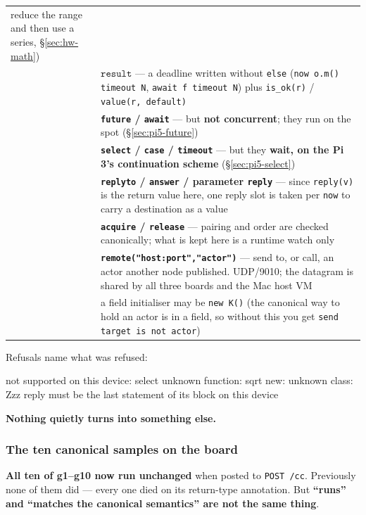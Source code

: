 \documentclass[11pt,a4paper]{article}
\newcommand{\ty}[1]{\ensuremath{\mathtt{#1}}}
\begin{document}
\begin{center}
\begin{tabular}{@{}p{20mm}p{102mm}@{}}
       reduce the range and then use a series, \S\ref{sec:hw-math}) \\
     & \textbf{\ty{result}} --- a deadline written without \texttt{else}
       (\texttt{now o.m() timeout N}, \texttt{await f timeout N}) plus
       \texttt{is\_ok(r)} / \texttt{value(r, default)} \\
     & \textbf{\texttt{future} / \texttt{await}} --- but \textbf{not
       concurrent}; they run on the spot (\S\ref{sec:pi5-future}) \\
     & \textbf{\texttt{select} / \texttt{case} / \texttt{timeout}} --- but they
       \textbf{wait, on the Pi 3's continuation scheme} (\S\ref{sec:pi5-select}) \\
     & \textbf{\texttt{replyto} / \texttt{answer} / parameter \texttt{reply}}
       --- since \texttt{reply(v)} is the return value here, one reply slot is
       taken per \texttt{now} to carry a destination as a value \\
     & \textbf{\texttt{acquire} / \texttt{release}} --- pairing and order are
       checked canonically; what is kept here is a runtime watch only \\
     & \textbf{\texttt{remote("host:port","actor")}} --- send to, or call, an
       actor another node published. UDP/9010; the datagram is shared by all
       three boards and the Mac host VM \\
     & a field initialiser may be \texttt{new K()} (the canonical way to hold
       an actor is in a field, so without this you get
       \texttt{send target is not actor}) \\

\bottomrule
\end{tabular}
\end{center}

Refusals name what was refused:

\begin{term}
not supported on this device: select
unknown function: sqrt
new: unknown class: Zzz
reply must be the last statement of its block on this device
\end{term}

\noindent\textbf{Nothing quietly turns into something else.}

\subsubsection*{The ten canonical samples on the board}

\textbf{All ten of g1--g10 now run unchanged} when posted to \texttt{POST /cc}.
Previously none of them did --- every one died on its return-type annotation.
But \textbf{``runs'' and ``matches the canonical semantics'' are not the same
thing}.
\end{document}
